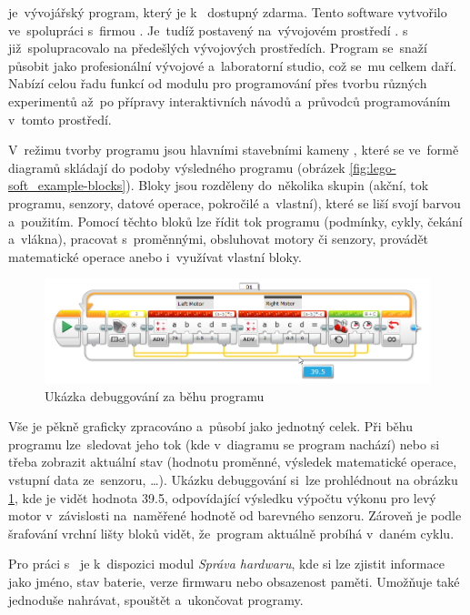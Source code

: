 \legoSW{} je~vývojářský program, který je k~\EVthree{} dostupný zdarma. 
Tento  software vytvořilo \lego{} ve~spolupráci s~firmou \NI{}. 
Je~tudíž postavený na~vývojovém prostředí \labview{}. 
\lego{} s~\NI{} již~spolupracovalo na předešlých vývojových prostředích. 
Program se~snaží působit jako profesionální vývojové a~laboratorní studio, což se~mu celkem daří.
Nabízí celou řadu funkcí od modulu pro programování přes tvorbu různých experimentů až~po přípravy interaktivních návodů a~průvodců programováním v~tomto prostředí.

V~režimu tvorby programu jsou hlavními stavebními kameny \EVblocks, které se ve~formě diagramů skládají do podoby výsledného programu (obrázek \ref{fig:lego-soft_example-blocks}).
Bloky jsou rozděleny do~několika skupin (akční, tok programu, senzory, datové operace, pokročilé a~vlastní), které se liší svojí barvou a~použitím. 
Pomocí těchto bloků lze řídit tok programu (podmínky, cykly, čekání a~vlákna), pracovat s~proměnnými, obsluhovat motory či senzory, provádět matematické operace anebo i~využívat vlastní bloky.

\begin{figure}[h]
	\centering
	\includegraphics[width=\textwidth]{images/lego-soft_live-debugging_line-advance.png}
	\caption{Ukázka debuggování za běhu programu}
	\label{fig:lego-soft_live-debugging_line-advance}
\end{figure}

Vše je pěkně graficky zpracováno a~působí jako jednotný celek. 
Při běhu programu lze~sledovat jeho tok (kde v~diagramu se program nachází) nebo si třeba zobrazit aktuální stav (hodnotu proměnné, výsledek matematické operace, vstupní data ze~senzoru, \dots). 
Ukázku debuggování si~lze prohlédnout na obrázku \ref{fig:lego-soft_live-debugging_line-advance}, kde je vidět hodnota 39.5, odpovídající výsledku výpočtu výkonu pro levý motor v~závislosti na~naměřené hodnotě od barevného senzoru.
Zároveň je podle šrafování vrchní lišty bloků vidět, že~program aktuálně probíhá v~daném cyklu.

Pro práci s~ je k~dispozici modul {\it Správa hardwaru}, kde si lze zjistit informace jako jméno, stav baterie, verze firmwaru nebo obsazenost paměti. 
Umožňuje také jednoduše nahrávat, spouštět a~ukončovat programy. 

